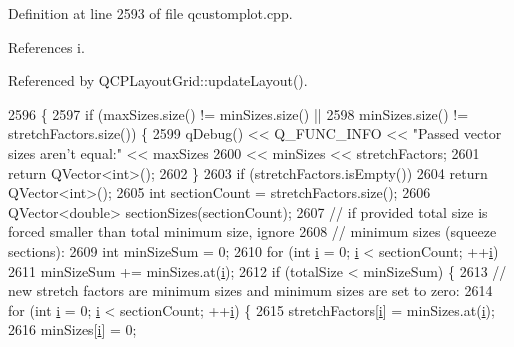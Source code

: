 Definition at line 2593 of file qcustomplot.\+cpp.



References i.



Referenced by Q\+C\+P\+Layout\+Grid\+::update\+Layout().


\begin{DoxyCode}
2596                                                              \{
2597   \textcolor{keywordflow}{if} (maxSizes.size() != minSizes.size() ||
2598       minSizes.size() != stretchFactors.size()) \{
2599     qDebug() << Q\_FUNC\_INFO << \textcolor{stringliteral}{"Passed vector sizes aren't equal:"} << maxSizes
2600              << minSizes << stretchFactors;
2601     \textcolor{keywordflow}{return} QVector<int>();
2602   \}
2603   \textcolor{keywordflow}{if} (stretchFactors.isEmpty())
2604     \textcolor{keywordflow}{return} QVector<int>();
2605   \textcolor{keywordtype}{int} sectionCount = stretchFactors.size();
2606   QVector<double> sectionSizes(sectionCount);
2607   \textcolor{comment}{// if provided total size is forced smaller than total minimum size, ignore}
2608   \textcolor{comment}{// minimum sizes (squeeze sections):}
2609   \textcolor{keywordtype}{int} minSizeSum = 0;
2610   \textcolor{keywordflow}{for} (\textcolor{keywordtype}{int} \hyperlink{_comparision_pictures_2_createtest_image_8m_a6f6ccfcf58b31cb6412107d9d5281426}{i} = 0; \hyperlink{_comparision_pictures_2_createtest_image_8m_a6f6ccfcf58b31cb6412107d9d5281426}{i} < sectionCount; ++\hyperlink{_comparision_pictures_2_createtest_image_8m_a6f6ccfcf58b31cb6412107d9d5281426}{i})
2611     minSizeSum += minSizes.at(\hyperlink{_comparision_pictures_2_createtest_image_8m_a6f6ccfcf58b31cb6412107d9d5281426}{i});
2612   \textcolor{keywordflow}{if} (totalSize < minSizeSum) \{
2613     \textcolor{comment}{// new stretch factors are minimum sizes and minimum sizes are set to zero:}
2614     \textcolor{keywordflow}{for} (\textcolor{keywordtype}{int} \hyperlink{_comparision_pictures_2_createtest_image_8m_a6f6ccfcf58b31cb6412107d9d5281426}{i} = 0; \hyperlink{_comparision_pictures_2_createtest_image_8m_a6f6ccfcf58b31cb6412107d9d5281426}{i} < sectionCount; ++\hyperlink{_comparision_pictures_2_createtest_image_8m_a6f6ccfcf58b31cb6412107d9d5281426}{i}) \{
2615       stretchFactors[\hyperlink{_comparision_pictures_2_createtest_image_8m_a6f6ccfcf58b31cb6412107d9d5281426}{i}] = minSizes.at(\hyperlink{_comparision_pictures_2_createtest_image_8m_a6f6ccfcf58b31cb6412107d9d5281426}{i});
2616       minSizes[\hyperlink{_comparision_pictures_2_createtest_image_8m_a6f6ccfcf58b31cb6412107d9d5281426}{i}] = 0;

\end{DoxyCode}
